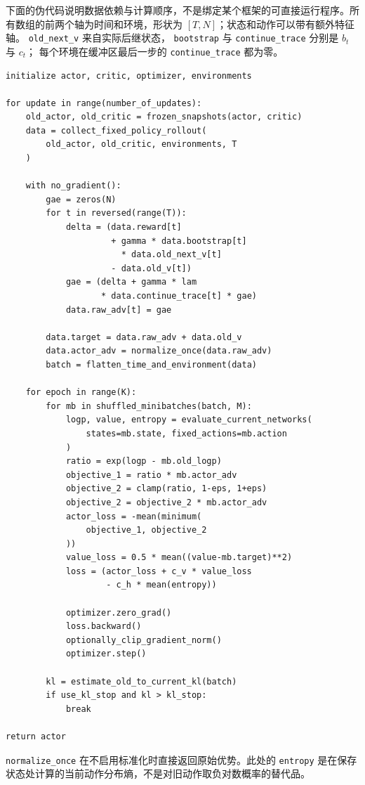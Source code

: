 \documentclass[UTF8,12pt,a4paper,fontset=fandol]{ctexart}
\begin{document}
下面的伪代码说明数据依赖与计算顺序，不是绑定某个框架的可直接运行程序。所有数组的前两个轴为时间和环境，形状为 $[T,N]$；状态和动作可以带有额外特征轴。
\texttt{old\_next\_v} 来自实际后继状态，
\texttt{bootstrap} 与 \texttt{continue\_trace} 分别是 $b_t$ 与 $c_t$；
每个环境在缓冲区最后一步的 \texttt{continue\_trace} 都为零。

\begin{verbatim}
initialize actor, critic, optimizer, environments

for update in range(number_of_updates):
    old_actor, old_critic = frozen_snapshots(actor, critic)
    data = collect_fixed_policy_rollout(
        old_actor, old_critic, environments, T
    )

    with no_gradient():
        gae = zeros(N)
        for t in reversed(range(T)):
            delta = (data.reward[t]
                     + gamma * data.bootstrap[t]
                       * data.old_next_v[t]
                     - data.old_v[t])
            gae = (delta + gamma * lam
                   * data.continue_trace[t] * gae)
            data.raw_adv[t] = gae

        data.target = data.raw_adv + data.old_v
        data.actor_adv = normalize_once(data.raw_adv)
        batch = flatten_time_and_environment(data)

    for epoch in range(K):
        for mb in shuffled_minibatches(batch, M):
            logp, value, entropy = evaluate_current_networks(
                states=mb.state, fixed_actions=mb.action
            )
            ratio = exp(logp - mb.old_logp)
            objective_1 = ratio * mb.actor_adv
            objective_2 = clamp(ratio, 1-eps, 1+eps)
            objective_2 = objective_2 * mb.actor_adv
            actor_loss = -mean(minimum(
                objective_1, objective_2
            ))
            value_loss = 0.5 * mean((value-mb.target)**2)
            loss = (actor_loss + c_v * value_loss
                    - c_h * mean(entropy))

            optimizer.zero_grad()
            loss.backward()
            optionally_clip_gradient_norm()
            optimizer.step()

        kl = estimate_old_to_current_kl(batch)
        if use_kl_stop and kl > kl_stop:
            break

return actor
\end{verbatim}

\texttt{normalize\_once} 在不启用标准化时直接返回原始优势。此处的
\texttt{entropy} 是在保存状态处计算的当前动作分布熵，不是对旧动作取负对数概率的替代品。
\end{document}
